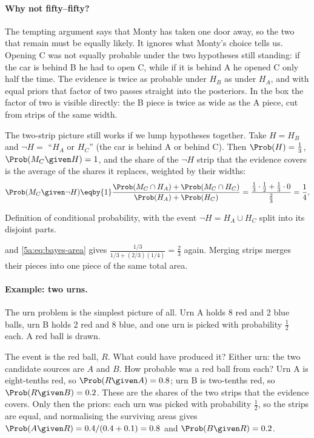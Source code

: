 \paragraph{Why not fifty--fifty?}
The tempting argument says that Monty has taken one door away, so the two that
remain must be equally likely. It ignores what Monty's choice tells us. Opening
C was not equally probable under the two hypotheses still standing: if the car
is behind B he had to open C, while if it is behind A he opened C only half the
time. The evidence is twice as probable under $H_B$ as under $H_A$, and with
equal priors that factor of two passes straight into the posteriors.
In the box the factor of two is visible directly: the B piece is twice as wide as
the A piece, cut from strips of the same width.

The two-strip picture still works if we lump hypotheses together. Take $H=H_B$ and
$\neg H=$ ``$H_A$ or $H_C$'' (the car is behind A or behind C). Then $\Prob(H)=\frac13$, $\Prob(M_C\given
H)=1$, and the share of the $\neg H$ strip that the evidence covers is the average
of the shares it replaces, weighted by their widths:
\begin{align*}
  \Prob(M_C\given\neg H)
  \eqby{1}\frac{\Prob(M_C\cap H_A)+\Prob(M_C\cap H_C)}{\Prob(H_A)+\Prob(H_C)}
  =\frac{\tfrac13\cdot\tfrac12+\tfrac13\cdot0}{\tfrac23}=\frac14 ,
\end{align*}
\begin{explain}
  \item Definition of conditional probability, with the event $\neg H=H_A\cup H_C$
        split into its disjoint parts.
\end{explain}
and \eqref{5a:eq:bayes-area} gives $\frac{1/3}{1/3+(2/3)(1/4)}=\frac23$ again. Merging
strips merges their pieces into one piece of the same total area.

\paragraph{Example: two urns.}
The urn problem is the simplest picture of
all. Urn A holds 8 red and 2 blue balls, urn B holds 2 red and 8 blue, and one urn
is picked with probability $\frac12$ each. A red ball is drawn.

The event is the red ball, $R$. What could have produced it? Either urn: the
two candidate sources are $A$ and $B$. How probable was a red ball from each?
Urn A is eight-tenths red, so $\Prob(R\given A)=0.8$; urn B is two-tenths red, so
$\Prob(R\given B)=0.2$. These are the shares of the two strips that the evidence
covers. Only then the priors:
each urn was picked with probability $\frac12$, so the strips are equal, and
normalising the surviving areas gives
$\Prob(A\given R)=0.4/(0.4+0.1)=0.8$ and $\Prob(B\given R)=0.2$.

